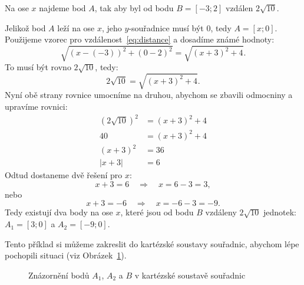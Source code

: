 \begin{example}
    Na ose $x$ najdeme bod $A$, tak aby byl od bodu $B = [-3;2]$ vzdálen $2\sqrt{10}$.

    Jelikož bod $A$ leží na ose $x$, jeho $y$-souřadnice musí být $0$, tedy $A = [x; 0]$. 
    Použijeme vzorec pro vzdálenost~\eqref{eq:distance} a dosadíme známé hodnoty:
    \[
    \sqrt{(x - (-3))^2 + (0 - 2)^2} = \sqrt{(x + 3)^2 + 4}.
    \]
    To musí být rovno $2\sqrt{10}$, tedy:
    \[
    2\sqrt{10} = \sqrt{(x + 3)^2 + 4}.
    \]
    Nyní obě strany rovnice umocníme na druhou, abychom se zbavili odmocniny a upravíme rovnici:
    \begin{align*}
        (2\sqrt{10})^2 &= (x + 3)^2 + 4 \\
        40 &= (x + 3)^2 + 4 \\
        (x + 3)^2 &= 36 \\
        |x + 3| &= 6
    \end{align*}
    Odtud dostaneme dvě řešení pro $x$:
    \[
    x + 3 = 6 \quad \Rightarrow \quad x = 6 - 3 = 3,
    \]
    nebo
    \[
    x + 3 = -6 \quad \Rightarrow \quad x = -6 - 3 = -9.
    \]
    Tedy existují dva body na ose $x$, které jsou od bodu $B$ vzdáleny $2\sqrt{10}$ jednotek: $A_1 = [3; 0]$ a $A_2 = [-9; 0]$.

    Tento příklad si můžeme zakreslit do kartézské soustavy souřadnic, abychom lépe pochopili situaci (viz Obrázek~\ref{fig:distance_example}).

    \begin{figure}[H]
        \centering
        \caption{Znázornění bodů $A_1$, $A_2$ a $B$ v kartézské soustavě souřadnic}
        \label{fig:distance_example}
    \end{figure}

\end{example}



